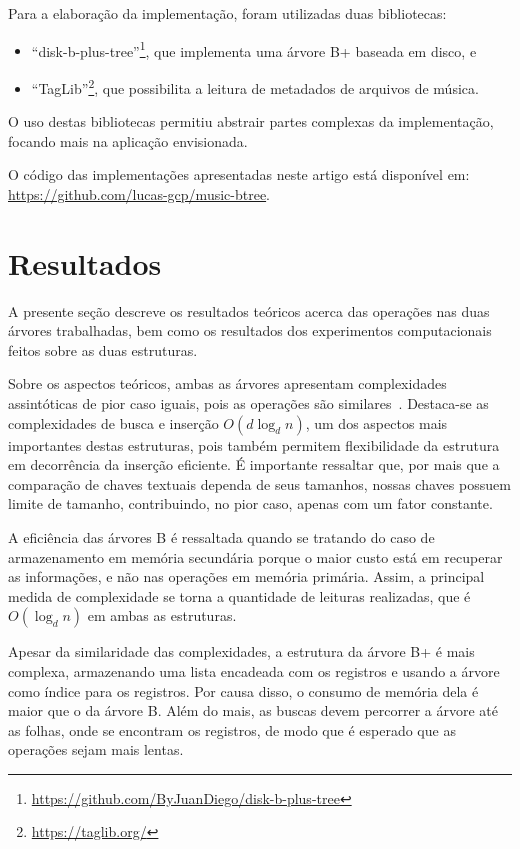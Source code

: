 \documentclass[12pt]{article}
\begin{document}
Para a elaboração da implementação, foram utilizadas duas bibliotecas: 
\begin{itemize}
  \item ``disk-b-plus-tree''\footnote{\url{https://github.com/ByJuanDiego/disk-b-plus-tree}},
    que implementa uma árvore B+ baseada em disco, e
  \item ``TagLib''\footnote{\url{https://taglib.org/}},
    que possibilita a leitura de metadados de arquivos de música.
\end{itemize}
O uso destas bibliotecas permitiu abstrair partes complexas da implementação,
focando mais na aplicação envisionada.

O código das implementações apresentadas neste artigo está disponível em:
\url{https://github.com/lucas-gcp/music-btree}.

\section{Resultados} \label{sec:results}
A presente seção descreve os resultados teóricos acerca das operações nas duas
árvores trabalhadas, bem como os resultados dos experimentos computacionais
feitos sobre as duas estruturas.

Sobre os aspectos teóricos, ambas as árvores apresentam complexidades assintóticas
de pior caso iguais, pois as operações são similares~\cite{Co:79}.
Destaca-se as complexidades de busca e inserção $O(d \log_d n)$, um dos aspectos
mais importantes destas estruturas, pois também permitem flexibilidade da estrutura
em decorrência da inserção eficiente.
É importante ressaltar que, por mais que a comparação de chaves textuais dependa
de seus tamanhos, nossas chaves possuem limite de tamanho, contribuindo, no pior
caso, apenas com um fator constante.

A eficiência das árvores B é ressaltada quando se tratando do caso de armazenamento
em memória secundária porque o maior custo está em recuperar as informações, e 
não nas operações em memória primária.
Assim, a principal medida de complexidade se torna a quantidade de leituras
realizadas, que é $O(\log_d n)$ em ambas as estruturas.

Apesar da similaridade das complexidades, a estrutura da árvore B+ é mais complexa,
armazenando uma lista encadeada com os registros e usando a árvore como índice
para os registros.
Por causa disso, o consumo de memória dela é maior que o da árvore B.
Além do mais, as buscas devem percorrer a árvore até as folhas, onde se encontram
os registros, de modo que é esperado que as operações sejam mais lentas.
\end{document}
